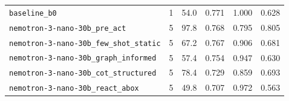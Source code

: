 \documentclass[11pt]{article}
\begin{document}
\begin{table}[H]
\begin{tabular}{@{}lrrrrr@{}}
\texttt{baseline\_b0} & 1 & 54.0 & 0.771 & 1.000 & 0.628 \\
\texttt{nemotron-3-nano-30b\_pre\_act} & 5 & 97.8 & 0.768 & 0.795 & 0.805 \\
\texttt{nemotron-3-nano-30b\_few\_shot\_static} & 5 & 67.2 & 0.767 & 0.906 & 0.681 \\
\texttt{nemotron-3-nano-30b\_graph\_informed} & 5 & 57.4 & 0.754 & 0.947 & 0.630 \\
\texttt{nemotron-3-nano-30b\_cot\_structured} & 5 & 78.4 & 0.729 & 0.859 & 0.693 \\
\texttt{nemotron-3-nano-30b\_react\_abox} & 5 & 49.8 & 0.707 & 0.972 & 0.563 \\
\bottomrule\end{tabular}\end{table}









\end{document}
